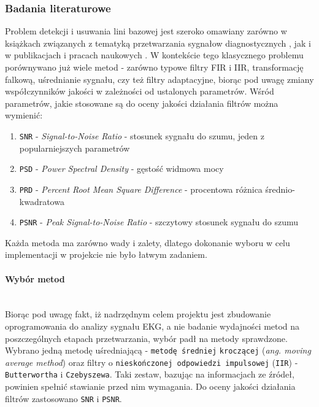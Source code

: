\documentclass[a4paper, 11pt]{article}
\begin{document}
\subsubsection{Badania literaturowe}
\label{sec:baseline:papers}
Problem detekcji i usuwania lini bazowej jest szeroko omawiany zarówno w książkach związanych z tematyką przetwarzania sygnałow diagnostycznych \cite{AUGUST1}, jak i w publikacjach i pracach naukowych \cite{KAUR1}\cite{MUKA1}. W kontekście tego klasycznego problemu porównywano już wiele metod - zarówno typowe filtry FIR i IIR, transformację falkową, uśrednianie sygnału, czy też filtry adaptacyjne, biorąc pod uwagę zmiany współczynników jakości w zależności od ustalonych parametrów. Wśród parametrów, jakie stosowane są do oceny jakości działania filtrów można wymienić:
\begin{enumerate}
\item \verb+SNR+ - \textit{Signal-to-Noise Ratio} -  stosunek sygnału do szumu, jeden z popularniejszych parametrów
\item \verb+PSD+ - \textit{Power Spectral Density} - gęstość widmowa mocy
\item \verb+PRD+ - \textit{Percent Root Mean Square Difference} - procentowa różnica średnio-kwadratowa
\item \verb+PSNR+ - \textit{Peak Signal-to-Noise Ratio} - szczytowy stosunek sygnału do szumu
\end{enumerate}
Każda metoda ma zarówno wady i zalety, dlatego dokonanie wyboru w celu implementacji w projekcie nie było łatwym zadaniem.

\paragraph{Wybór metod}
\mbox{} \\
Biorąc pod uwagę fakt, iż nadrzędnym celem projektu jest zbudowanie oprogramowania do analizy sygnału EKG, a nie badanie wydajności metod na poszczególnych etapach przetwarzania, wybór padł na metody sprawdzone. Wybrano jedną metodę uśredniającą - \verb|metodę średniej| \verb|kroczącej| (\textit{ang. moving average method}) oraz filtry o \verb|nieskończonej odpowiedzi impulsowej| (\verb|IIR|) - \verb|Butterwortha| i \verb|Czebyszewa|. Taki zestaw, bazując na informacjach ze źródeł, powinien spełnić stawianie przed nim wymagania. Do oceny jakości działania filtrów zastosowano \verb|SNR| i \verb|PSNR|.
\end{document}
